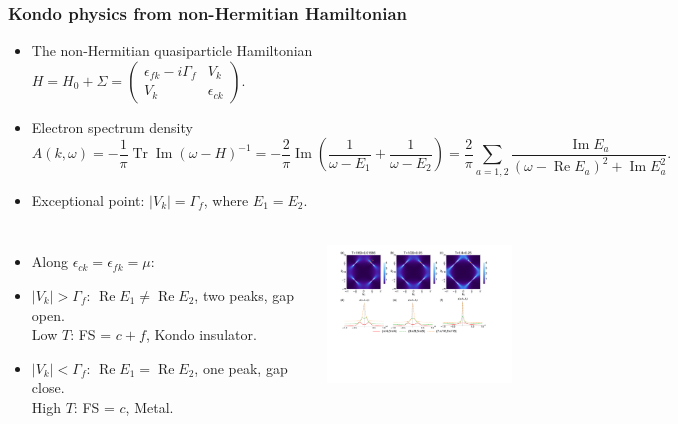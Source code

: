 \documentclass[xcolor=table, 10pt, aspectratio=169]{beamer}
\DeclareMathOperator{\tr}{Tr}
\DeclareMathOperator{\im}{Im}
\DeclareMathOperator{\re}{Re}
\begin{document}
\begin{frame}
\frametitle{Kondo physics from non-Hermitian Hamiltonian}
\begin{itemize}
\item The non-Hermitian quasiparticle Hamiltonian $H = H_0+\Sigma = \begin{pmatrix}
\epsilon_{fk} - i\Gamma_f & V_k\\ V_k & \epsilon_{ck}
\end{pmatrix}$.
\item Electron spectrum density
\[A(k, \omega)=-\frac1\pi\tr\im (\omega - H)^{-1}
=-\frac2\pi\im\left(
\frac1{\omega-E_1}+\frac1{\omega-E_2}\right)
=\frac2\pi\sum_{a=1,2}\frac{\im E_a}{(\omega-\re E_a)^2+\im E_a^2}.\]
\item Exceptional point: $|V_k|=\Gamma_f$, where $E_1=E_2$.
\end{itemize}

\begin{columns}
\begin{itemize}
\item Along $\epsilon_{ck}=\epsilon_{fk}=\mu$:
\item $|V_k|>\Gamma_f$: $\re E_1\neq\re E_2$, two peaks, gap open.\\
Low $T$: FS = $c+f$, Kondo insulator.
\item $|V_k|<\Gamma_f$: $\re E_1=\re E_2$, one peak, gap close.\\
High $T$: FS = $c$, Metal.
\end{itemize}
	\includegraphics[height=4cm]{arc2}
\end{columns}
\end{frame}
\end{document}

